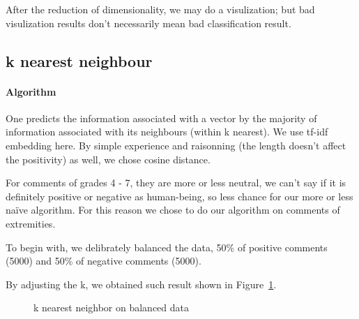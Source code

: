 \documentclass{article}
\begin{document}
After the reduction of dimensionality, we may do a visulization; but
bad visulization results don't necessarily mean bad classification result.

\subsection{k nearest neighbour}

\paragraph{Algorithm} One predicts the information associated with a vector by the majority
of information associated with its neighbours (within k nearest).
We use tf-idf embedding here.
By simple experience
and raisonning (the length doesn't affect the positivity) as well, we chose cosine distance.

For comments of grades 4 - 7, they are more or less neutral, we can't
say if it is definitely positive or negative as human-being, so less chance
for our more or less naïve algorithm. For this reason we chose
to do our algorithm on comments of extremities.

To begin with, we delibrately balanced the data, 50\% of positive comments (5000)
and 50\% of negative comments (5000).

By adjusting the k, we obtained such result shown in Figure~\ref{fig:knn1}.

\begin{figure}[htbp]
  \centering
  \caption{k nearest neighbor on balanced data}
  \label{fig:knn1}
\end{figure}
\end{document}
